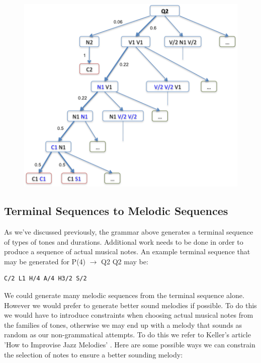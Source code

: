 \documentclass[pdftex,12pt,a4paper]{report}
\begin{document}
\begin{figure}[here]
  \centering
  \includegraphics[scale=0.8]{figure/Q2parsetree.png}
  \label{fig:Q2parsetree}
\end{figure}

\subsection{Terminal Sequences to Melodic Sequences}
As we've discussed previously, the grammar above generates a terminal sequence of types of tones and durations. Additional work needs to be done in order to produce a sequence of actual musical notes. An example terminal sequence that may be generated for P(4) $\rightarrow$ Q2 Q2 may be:

\begin{verbatim}
C/2 L1 H/4 A/4 H3/2 S/2
\end{verbatim}

We could generate many melodic sequences from the terminal sequence alone. However we would prefer to generate better sound melodies if possible. To do this we would have to introduce constraints when choosing actual musical notes from the families of tones, otherwise we may end up with a melody that sounds as random as our non-grammatical attempts. To do this we refer to Keller's article 'How to Improvise Jazz Melodies' \cite{jazzkeller}. Here are some possible ways we can constrain the selection of notes to ensure a better sounding melody:
\end{document}
